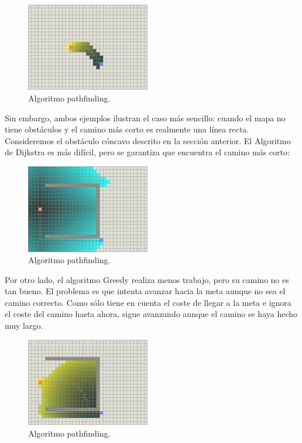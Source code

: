 \documentclass[reprint,amsmath,amssymb,aps]{revtex4-2}
\begin{document}
\begin{figure}[H]
 	\centering
 	\includegraphics[width=0.48\textwidth]{greedy.png}
 	\caption{Algoritmo pathfinding.}
 	\label{a}
\end{figure}

Sin embargo, ambos ejemplos ilustran el caso más sencillo: cuando el mapa no tiene obstáculos y el camino más corto es realmente una línea recta. Consideremos el obstáculo cóncavo descrito en la sección anterior. El Algoritmo de Dijkstra es más difícil, pero se garantiza que encuentra el camino más corto:

\begin{figure}[H]
 	\centering
 	\includegraphics[width=0.48\textwidth]{dijkstra-trap.png}
 	\caption{Algoritmo pathfinding.}
 	\label{dijkstra-trap}
\end{figure}
 
Por otro lado, el algoritmo Greedy realiza menos trabajo, pero su camino no es tan bueno. El problema es que intenta avanzar hacia la meta aunque no sea el camino correcto. Como sólo tiene en cuenta el coste de llegar a la meta e ignora el coste del camino hasta ahora, sigue avanzando aunque el camino se haya hecho muy largo.
 
\begin{figure}[H]
 	\centering
 	\includegraphics[width=0.48\textwidth]{greedy-trap.png}
 	\caption{Algoritmo pathfinding.}
 	\label{a-trap}
\end{figure}
\end{document}

